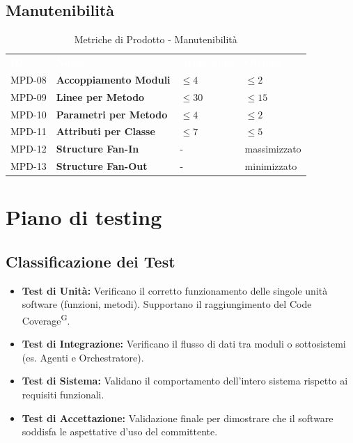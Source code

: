 \documentclass[a4paper, 11pt]{article}
\begin{document}
\subsection{Manutenibilità}
\begin{table}[h!]
    \centering
    \begin{tabular}{>{\centering\arraybackslash}m{1.5cm} p{6cm} >{\centering\arraybackslash}m{3cm} >{\centering\arraybackslash}m{2.5cm}}
        \rowcolor{AccentColor}
        \textcolor{white}{\textbf{ID}} & \textcolor{white}{\textbf{Nome}} & \textcolor{white}{\textbf{Accettabile}} & \textcolor{white}{\textbf{Ottimo}} \\
        MPD-08 & \textbf{Accoppiamento Moduli} & $\leq 4$ & $\leq 2$ \\
        MPD-09 & \textbf{Linee per Metodo} & $\leq 30$ & $\leq 15$ \\
        MPD-10 & \textbf{Parametri per Metodo} & $\leq 4$ & $\leq 2$ \\
        MPD-11 & \textbf{Attributi per Classe} & $\leq 7$ & $\leq 5$ \\
        MPD-12 & \textbf{Structure Fan-In} & - & massimizzato \\
        MPD-13 & \textbf{Structure Fan-Out} & - & minimizzato \\
    \end{tabular}
    \caption{Metriche di Prodotto - Manutenibilità}
\end{table}

\newpage

\section{Piano di testing}

\subsection{Classificazione dei Test}
\begin{itemize}
    \item \textbf{Test di Unità:} Verificano il corretto funzionamento delle singole unità software (funzioni, metodi). Supportano il raggiungimento del Code Coverage\textsuperscript{G}.
    \item \textbf{Test di Integrazione:} Verificano il flusso di dati tra moduli o sottosistemi (es. Agenti e Orchestratore).
    \item \textbf{Test di Sistema:} Validano il comportamento dell'intero sistema rispetto ai requisiti funzionali.
    \item \textbf{Test di Accettazione:} Validazione finale per dimostrare che il software soddisfa le aspettative d'uso del committente.
\end{itemize}
\end{document}
